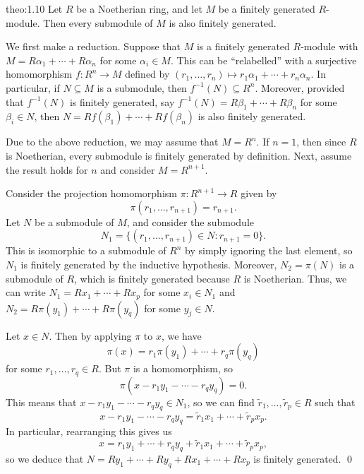 \begin{theo}{theo:1.10}
    Let $R$ be a Noetherian ring, and let $M$ be a finitely generated $R$-module. 
    Then every submodule of $M$ is also finitely generated. 
\end{theo}\vspace{-0.25cm}

We first make a reduction. Suppose that $M$ is a finitely generated $R$-module 
with $M = R\alpha_1 + \cdots + R\alpha_n$ for some $\alpha_i \in M$. This 
can be ``relabelled'' with a surjective homomorphism $f : R^n \to M$ 
defined by $(r_1, \dots, r_n) \mapsto r_1 \alpha_1 + \cdots + r_n \alpha_n$. 
In particular, if $N \subseteq M$ is a submodule, then $f^{-1}(N) \subseteq 
R^n$. Moreover, provided that $f^{-1}(N)$ is finitely generated, say 
$f^{-1}(N) = R\beta_1 + \cdots + R\beta_n$ for some $\beta_i \in N$, 
then $N = Rf(\beta_1) + \cdots + Rf(\beta_n)$ is also finitely generated.

\begin{pf}
    Due to the above reduction, we may assume that $M = R^n$. If $n = 1$, 
    then since $R$ is Noetherian, every submodule is finitely generated by 
    definition. Next, assume the result holds for $n$ and consider $M = R^{n+1}$.

    Consider the projection homomorphism $\pi : R^{n+1} \to R$ given by 
    \[ \pi(r_1, \dots, r_{n+1}) = r_{n+1}. \] 
    Let $N$ be a submodule of $M$, and consider the submodule 
    \[ N_1 = \{(r_1, \dots, r_{n+1}) \in N : r_{n+1} = 0\}. \] 
    This is isomorphic to a submodule of $R^n$ by simply ignoring the 
    last element, so $N_1$ is finitely generated by the inductive hypothesis. 
    Moreover, $N_2 = \pi(N)$ is a submodule of $R$, which is finitely 
    generated because $R$ is Noetherian. Thus, we can write 
    $N_1 = Rx_1 + \cdots + Rx_p$ for some $x_i \in N_1$ and 
    $N_2 = R\pi(y_1) + \cdots + R\pi(y_q)$ for some $y_j \in N$. 

    Let $x \in N$. Then by applying $\pi$ to $x$, we have 
    \[ \pi(x) = r_1 \pi(y_1) + \cdots + r_q \pi(y_q) \] 
    for some $r_1, \dots, r_q \in R$. But $\pi$ is a homomorphism, so 
    \[ \pi(x - r_1 y_1 - \cdots - r_q y_q) = 0. \] 
    This means that $x - r_1 y_1 - \cdots - r_q y_q \in N_1$, so we can 
    find $\tilde{r}_1, \dots, \tilde{r}_p \in R$ such that 
    \[ x - r_1 y_1 - \cdots - r_q y_q = \tilde{r}_1 x_1 + \cdots 
    + \tilde{r}_p x_p. \] 
    In particular, rearranging this gives us
    \[ x = r_1 y_1 + \cdots + r_q y_q + \tilde{r}_1 x_1 + \cdots 
    + \tilde{r}_p x_p, \] 
    so we deduce that $N = Ry_1 + \cdots + Ry_q + Rx_1 + \cdots + Rx_p$ 
    is finitely generated. \qed
\end{pf}\vspace{-0.25cm}

